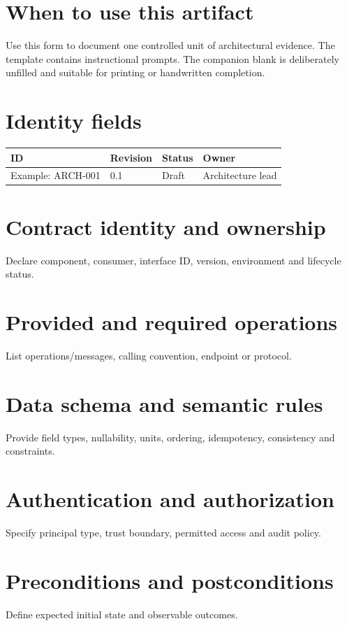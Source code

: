 \documentclass[10pt,letterpaper]{article}
\begin{document}
\DocProvenance
\section{When to use this artifact}
Use this form to document one controlled unit of architectural evidence. The template contains instructional prompts. The companion blank is deliberately unfilled and suitable for printing or handwritten completion.

\section{Identity fields}
\small
\begin{tabularx}{\linewidth}{@{}YYYY@{}}
\toprule
\textbf{ID} & \textbf{Revision} & \textbf{Status} & \textbf{Owner} \\
\midrule
Example: ARCH-001 & 0.1 & Draft & Architecture lead \\
\bottomrule
\end{tabularx}
\normalsize
\section{Contract identity and ownership}
Declare component, consumer, interface ID, version, environment and lifecycle status.

\section{Provided and required operations}
List operations/messages, calling convention, endpoint or protocol.

\section{Data schema and semantic rules}
Provide field types, nullability, units, ordering, idempotency, consistency and constraints.

\section{Authentication and authorization}
Specify principal type, trust boundary, permitted access and audit policy.

\section{Preconditions and postconditions}
Define expected initial state and observable outcomes.
\end{document}
